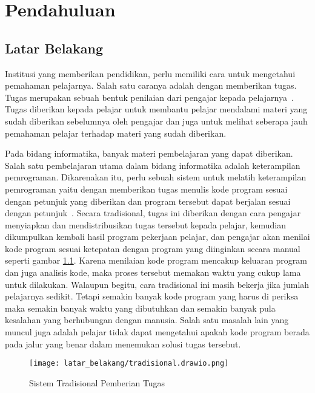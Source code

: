 \chapter{Pendahuluan}
\label{chap:intro}

\section{Latar Belakang}
\label{sec:1:latar_belakang}

Institusi yang memberikan pendidikan, perlu memiliki cara untuk mengetahui pemahaman pelajarnya. Salah satu caranya adalah dengan memberikan tugas. Tugas merupakan sebuah bentuk penilaian dari pengajar kepada pelajarnya~\cite{febriana:plagiarisme}. Tugas diberikan kepada pelajar untuk membantu pelajar mendalami materi yang sudah diberikan sebelumnya oleh pengajar dan juga untuk melihat seberapa jauh pemahaman pelajar terhadap materi yang sudah diberikan.

Pada bidang informatika, banyak materi pembelajaran yang dapat diberikan. Salah satu pembelajaran utama dalam bidang informatika adalah keterampilan pemrograman. Dikarenakan itu, perlu sebuah sistem untuk melatih keterampilan pemrograman yaitu dengan memberikan tugas menulis kode program sesuai dengan petunjuk yang diberikan dan program tersebut dapat berjalan sesuai dengan petunjuk~\cite{onder:judge}. Secara tradisional, tugas ini diberikan dengan cara pengajar menyiapkan dan mendistribusikan tugas tersebut kepada pelajar, kemudian dikumpulkan kembali hasil program pekerjaan pelajar, dan pengajar akan menilai kode program sesuai ketepatan dengan program yang diinginkan secara manual seperti gambar \ref{fig:1:tradisional}. Karena menilaian kode program mencakup keluaran program dan juga analisis kode, maka proses tersebut memakan waktu yang cukup lama untuk dilakukan. Walaupun begitu, cara tradisional ini masih bekerja jika jumlah pelajarnya sedikit.
Tetapi semakin banyak kode program yang harus di periksa maka semakin banyak waktu yang dibutuhkan dan semakin banyak pula kesalahan yang berhubungan dengan manusia. Salah satu masalah lain yang muncul juga adalah pelajar tidak dapat mengetahui apakah kode program berada pada jalur yang benar dalam menemukan solusi tugas tersebut.

\begin{figure}[H]
    \centering
    \texttt{[image: latar\_belakang/tradisional.drawio.png]}
    \caption[Sistem Tradisional Pemberian Tugas]{Sistem Tradisional Pemberian Tugas}
    \label{fig:1:tradisional}
\end{figure}

